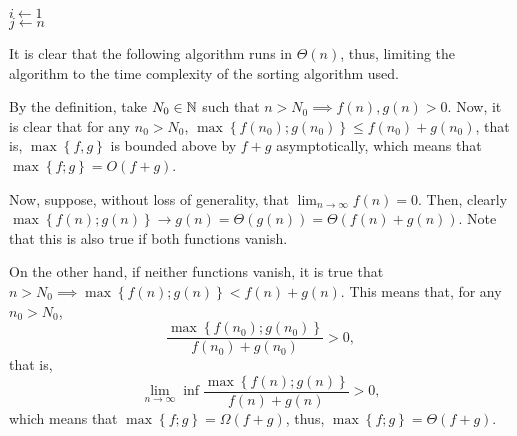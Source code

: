 \documentclass[a4paper]{report}
\begin{document}
\begin{algorithm}[H]
    $i\gets 1$ \\
    $j \gets n$ \\
\end{algorithm}

It is clear that the following algorithm runs in $\Theta \left( n \right) $, thus, limiting the algorithm to the time complexity of the sorting algorithm used.


By the definition, take $N_0 \in \mathbb{N}$ such that $n>N_0 \implies f\left( n \right) ,g\left( n \right) >0$. Now, it is clear that for any $n_0 > N_0$, $\max \left\{ f\left( n_0 \right) ; g\left( n_0 \right)  \right\} \le  f\left( n_0 \right) +g\left( n_0 \right) $, that is, $\max \left\{ f, g \right\} $ is bounded above by $f+g$ asymptotically, which means that $\max\left\{ f;g \right\} = O\left( f+g \right) $.

Now, suppose, without loss of generality, that $\lim_{n \to \infty} f\left( n \right) = 0$. Then, clearly $\max\left\{ f\left( n \right);g\left( n \right)  \right\} \to  g\left( n \right) = \Theta\left( g\left( n \right)  \right)= \Theta\left( f\left( n \right) +g\left( n \right)\right)$. Note that this is also true if both functions vanish.

On the other hand, if neither functions vanish, it is true that $ n> N_0 \implies \max\left\{ f\left( n \right) ;g\left( n \right)  \right\} < f\left( n \right) + g\left( n \right) $. This means that, for any $n_0 > N_0$, \[
    \frac{\max\left\{ f\left( n_0 \right) ;g\left( n_0 \right)  \right\} }{f\left( n_0 \right) + g\left( n_0 \right) } > 0
,\] that is, \[
\lim_{n \to \infty} \inf \frac{\max\left\{ f\left( n \right) ;g\left( n \right)  \right\} }{f\left( n \right) + g\left( n \right) } >0
,\] which means that $\max\left\{ f;g \right\} = \Omega\left( f + g \right) $, thus, $\max\left\{ f;g \right\} = \Theta\left( f + g \right) $.


\end{document}
